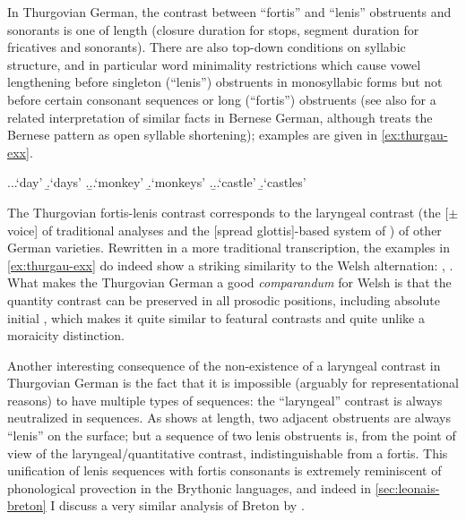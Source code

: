 In Thurgovian German, the contrast between \enquote{fortis} and \enquote{lenis} obstruents and sonorants is one of length (closure duration for stops, segment duration for fricatives and sonorants). There are also top-down conditions on syllabic structure, and in particular word minimality restrictions which cause vowel lengthening before singleton (\enquote{lenis}) obstruents in monosyllabic forms but not before certain consonant sequences or long (\enquote{fortis}) obstruents (see also \citealt{seiler05:_open_bernes_german} for a related interpretation of similar facts in Bernese German, although \citealt{ham01:_phonet} treats the Bernese pattern as open syllable shortening); examples are given in \ref{ex:thurgau-exx}.

\ex.\label{ex:thurgau-exx}\a.\a.\mbi{[ˈtːaːk]}`day'
\b.\mbi{[ˈtːakə]}`days'
\z.\b.\a.\mbi{[ˈafː]}`monkey'
\b.\mbi{[ˈafːə]}`monkeys'
\z.\b.\a.\mbi{[ˈpurk]}`castle'
\b.\mbi{[ˈpurkə]}`castles'

The Thurgovian fortis\hyp lenis contrast corresponds to the laryngeal contrast (\ie the [$\pm$voice] of traditional analyses and the [spread glottis]-based system of \citealt{iverson95,iverson99:_laryn_german,jessen02:_laryn_german,honeybone05}) of other German varieties. Rewritten in a more traditional transcription, the examples in \ref{ex:thurgau-exx} do indeed show a striking similarity to the Welsh alternation: \alternation{[ˈtaːɡ]}{[ˈtaɡə]}, \alternation{[ˈaf]}{[ˈafə]}. What makes the Thurgovian German a good \emph{comparandum} for Welsh is that the quantity contrast can be preserved in all prosodic positions, including absolute initial \citep{kraehenmann08:_durat_swiss_german}, which makes it quite similar to featural contrasts and quite unlike a moraicity distinction.

Another interesting consequence of the non\hyp existence of a laryngeal contrast in Thurgovian German is the fact that it is impossible (arguably for representational reasons) to have multiple types of sequences: the \enquote{laryngeal} contrast is always neutralized in sequences. As \citet{kraehenmann03:_quant_aleman} shows at length, two adjacent obstruents are always \enquote{lenis} on the surface; but a sequence of two lenis obstruents is, from the point of view of the laryngeal\fshyp quantitative contrast, indistinguishable from a fortis. This unification of lenis sequences with fortis consonants is extremely reminiscent of phonological provection in the Brythonic languages, and indeed in \cref{sec:leonais-breton} I discuss a very similar analysis of Breton by \citet{carlyle88:_breton}.

